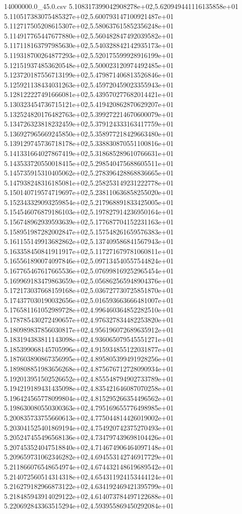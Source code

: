 \begin{filecontents*}{14000000.0_45.0.csv}
5.108317399042908278e+02,5.620949441116135858e+01
5.110517383075485327e+02,5.600793147100921487e+01
5.112717505208615307e+02,5.580637615852356248e+01
5.114917765447677880e+02,5.560482847492039582e+01
5.117118163797985630e+02,5.540328842142935173e+01
5.119318700264877293e+02,5.520175599928916199e+01
5.121519374853620548e+02,5.500023120974492485e+01
5.123720187556713199e+02,5.479871406813526846e+01
5.125921138434031263e+02,5.459720459023355943e+01
5.128122227491666081e+02,5.439570277682014421e+01
5.130323454736715121e+02,5.419420862870629207e+01
5.132524820176482763e+02,5.399272214670600079e+01
5.134726323818232459e+02,5.379124333163417759e+01
5.136927965669245850e+02,5.358977218429663480e+01
5.139129745736718178e+02,5.338830870551100816e+01
5.141331664027867419e+02,5.318685289610766631e+01
5.143533720550018415e+02,5.298540475688605511e+01
5.145735915310405062e+02,5.278396428868836665e+01
5.147938248316185081e+02,5.258253149231222778e+01
5.150140719574719697e+02,5.238110636858255020e+01
5.152343329093259854e+02,5.217968891833425005e+01
5.154546076879186103e+02,5.197827914236950164e+01
5.156748962939593639e+02,5.177687704152231163e+01
5.158951987282002847e+02,5.157548261659576383e+01
5.161155149913682862e+02,5.137409586841567943e+01
5.163358450841911917e+02,5.117271679781060811e+01
5.165561890074097846e+02,5.097134540557544824e+01
5.167765467617665536e+02,5.076998169252965454e+01
5.169969183479863659e+02,5.056862565948904376e+01
5.172173037668159168e+02,5.036727730725851870e+01
5.174377030190032656e+02,5.016593663666481007e+01
5.176581161052989728e+02,4.996460364852282510e+01
5.178785430272490657e+02,4.976327834482253820e+01
5.180989837856030817e+02,4.956196072689635912e+01
5.183194383811143098e+02,4.936065079545551271e+01
5.185399068145705996e+02,4.915934855122031877e+01
5.187603890867356995e+02,4.895805399491928256e+01
5.189808851983656268e+02,4.875676712728090934e+01
5.192013951502526652e+02,4.855548794902733789e+01
5.194219189431435098e+02,4.835421646087070258e+01
5.196424565778099804e+02,4.815295266354496562e+01
5.198630080550300363e+02,4.795169655776498985e+01
5.200835733755660613e+02,4.775044814426019002e+01
5.203041525401869194e+02,4.754920742375270493e+01
5.205247455496568136e+02,4.734797439698104426e+01
5.207453524047518840e+02,4.714674906464097148e+01
5.209659731062346282e+02,4.694553142746917729e+01
5.211866076548654974e+02,4.674432148619689542e+01
5.214072560514314318e+02,4.654311924153444124e+01
5.216279182966873122e+02,4.634192469421395799e+01
5.218485943914029122e+02,4.614073784497122688e+01
5.220692843363515294e+02,4.593955869450292084e+01

\end{filecontents*}
